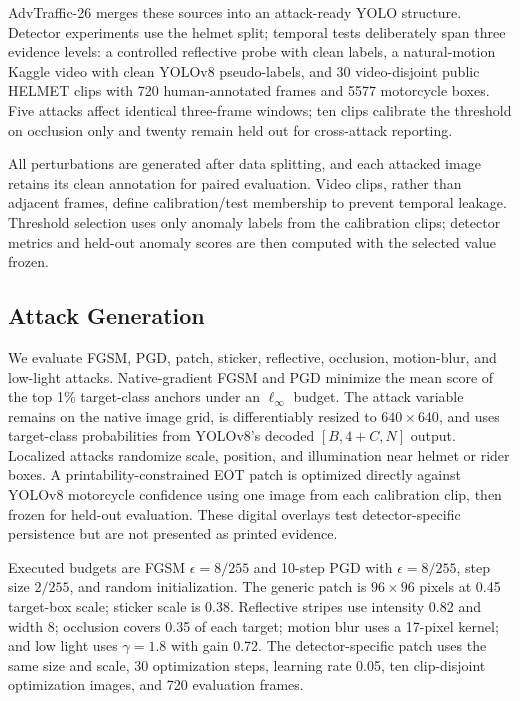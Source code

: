 \documentclass[runningheads,a4paper]{llncs}
\newcommand{\dataset}{AdvTraffic-26}
\begin{document}
\dataset{} merges these sources into an attack-ready YOLO structure. Detector experiments use the helmet split; temporal tests deliberately span three evidence levels: a controlled reflective probe with clean labels, a natural-motion Kaggle video with clean YOLOv8 pseudo-labels, and 30 video-disjoint public HELMET clips with 720 human-annotated frames and 5577 motorcycle boxes. Five attacks affect identical three-frame windows; ten clips calibrate the threshold on occlusion only and twenty remain held out for cross-attack reporting.

All perturbations are generated after data splitting, and each attacked image retains its clean annotation for paired evaluation. Video clips, rather than adjacent frames, define calibration/test membership to prevent temporal leakage. Threshold selection uses only anomaly labels from the calibration clips; detector metrics and held-out anomaly scores are then computed with the selected value frozen.

\subsection{Attack Generation}
We evaluate FGSM, PGD, patch, sticker, reflective, occlusion, motion-blur, and low-light attacks. Native-gradient FGSM and PGD minimize the mean score of the top 1\% target-class anchors under an $\ell_\infty$ budget. The attack variable remains on the native image grid, is differentiably resized to $640\times640$, and uses target-class probabilities from YOLOv8's decoded $[B,4+C,N]$ output. Localized attacks randomize scale, position, and illumination near helmet or rider boxes. A printability-constrained EOT patch is optimized directly against YOLOv8 motorcycle confidence using one image from each calibration clip, then frozen for held-out evaluation. These digital overlays test detector-specific persistence but are not presented as printed evidence.

Executed budgets are FGSM $\epsilon=8/255$ and 10-step PGD with $\epsilon=8/255$, step size $2/255$, and random initialization. The generic patch is $96\!\times\!96$ pixels at 0.45 target-box scale; sticker scale is 0.38. Reflective stripes use intensity 0.82 and width 8; occlusion covers 0.35 of each target; motion blur uses a 17-pixel kernel; and low light uses $\gamma=1.8$ with gain 0.72. The detector-specific patch uses the same size and scale, 30 optimization steps, learning rate 0.05, ten clip-disjoint optimization images, and 720 evaluation frames.
\end{document}
